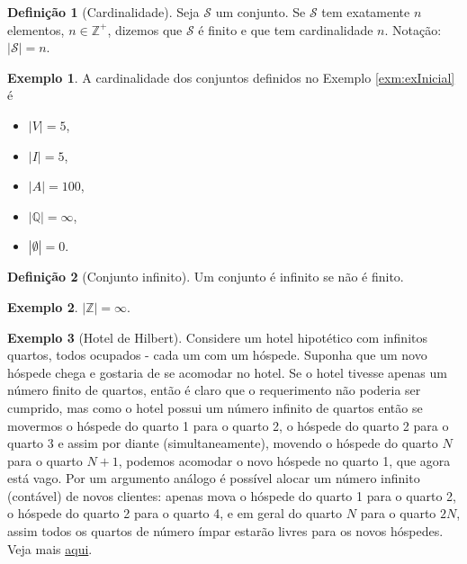 \documentclass[]{book}
\theoremstyle{definition}
\newtheorem{definition}{Definição}[chapter]
\theoremstyle{definition}
\newtheorem{example}{Exemplo}[chapter]
\theoremstyle{definition}
\theoremstyle{remark}
\begin{document}
\begin{definition}[Cardinalidade]
\protect\hypertarget{def:defcardin}{}{\label{def:defcardin} \iffalse (Cardinalidade) \fi{} }Seja \(\mathcal{S}\) um conjunto.
Se \(\mathcal{S}\) tem exatamente \(n\) elementos, \(n \in \mathbb{Z}^{+}\), dizemos que \(\mathcal{S}\) é finito e que tem cardinalidade \(n\).
Notação: \(|\mathcal{S}| = n\).
\end{definition}

\begin{example}
\protect\hypertarget{exm:unnamed-chunk-6}{}{\label{exm:unnamed-chunk-6} }A cardinalidade dos conjuntos definidos no Exemplo \ref{exm:exInicial} é

\begin{itemize}
\item
  \(|V| = 5\),
\item
  \(|I| = 5\),
\item
  \(|A| = 100\),
\item
  \(|\mathbb{Q}| = \infty\),
\item
  \(|\emptyset| = 0\).
\end{itemize}
\end{example}

\begin{definition}[Conjunto infinito]
\protect\hypertarget{def:definfty}{}{\label{def:definfty} \iffalse (Conjunto infinito) \fi{} }Um conjunto é infinito se não é finito.
\end{definition}

\begin{example}
\protect\hypertarget{exm:unnamed-chunk-7}{}{\label{exm:unnamed-chunk-7} }\(|\mathbb{Z}| = \infty.\)
\end{example}

\begin{example}[Hotel de Hilbert]
\protect\hypertarget{exm:unnamed-chunk-8}{}{\label{exm:unnamed-chunk-8} \iffalse (Hotel de Hilbert) \fi{} }Considere um hotel hipotético com infinitos quartos, todos ocupados - cada um com um hóspede.
Suponha que um novo hóspede chega e gostaria de se acomodar no hotel.
Se o hotel tivesse apenas um número finito de quartos, então é claro que o requerimento não poderia ser cumprido, mas como o hotel possui um número infinito de quartos então se movermos o hóspede do quarto 1 para o quarto 2, o hóspede do quarto 2 para o quarto 3 e assim por diante (simultaneamente), movendo o hóspede do quarto \(N\) para o quarto \(N+1\), podemos acomodar o novo hóspede no quarto 1, que agora está vago.
Por um argumento análogo é possível alocar um número infinito (contável) de novos clientes: apenas mova o hóspede do quarto 1 para o quarto 2, o hóspede do quarto 2 para o quarto 4, e em geral do quarto \(N\) para o quarto \(2N\), assim todos os quartos de número ímpar estarão livres para os novos hóspedes.
Veja mais \href{https://pt.wikipedia.org/wiki/Hotel_de_Hilbert}{aqui}.
\end{example}
\end{document}

